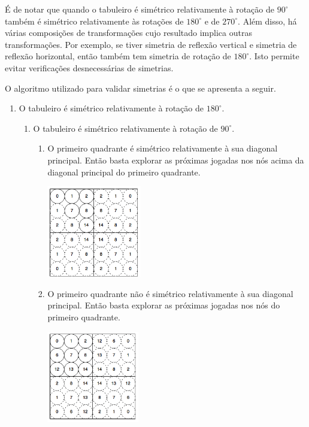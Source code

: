 É de notar que quando o tabuleiro é simétrico relativamente à rotação de $90^{\circ}$ também é simétrico relativamente às rotações de $180^{\circ}$ e de $270^{\circ}$. Além disso, há várias composições de transformações cujo resultado implica outras transformações. Por exemplo, se tiver simetria de reflexão vertical e simetria de reflexão horizontal, então também tem simetria de rotação de $180^{\circ}$. Isto permite evitar verificações desnecessárias de simetrias. 

O algoritmo utilizado para validar simetrias é o que se apresenta a seguir.
\begin{enumerate}
	\item O tabuleiro é simétrico relativamente à rotação de $180^{\circ}$.
		\begin{enumerate}
			\item O tabuleiro é simétrico relativamente à rotação de $90^{\circ}$.
			\begin{enumerate}
				\item O primeiro quadrante é simétrico relativamente à sua diagonal principal. Então basta explorar as próximas jogadas nos nós acima da diagonal principal do primeiro quadrante.
\begin{table}[H]
\centering
\includegraphics[height=4cm]{images/p180_90_dp0.png}
\end{table}			
				\item O primeiro quadrante não é simétrico relativamente à sua diagonal principal. Então basta explorar as próximas jogadas nos nós do primeiro quadrante.
\begin{table}[H]
\centering
\includegraphics[height=4cm]{images/p180_90.png}
\end{table}			

\end{enumerate}
\end{enumerate}
\end{enumerate}
